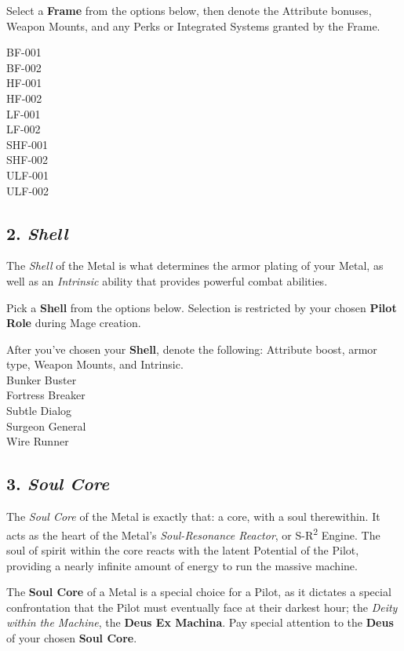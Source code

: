 \documentclass[
]{article}
\begin{document}
Select a \textbf{Frame} from the options below, then denote the
Attribute bonuses, Weapon Mounts, and any Perks or Integrated Systems
granted by the Frame.

{BF-001}\\
{BF-002}\\
{HF-001}\\
{HF-002}\\
{LF-001}\\
{LF-002}\\
{SHF-001}\\
{SHF-002}\\
{ULF-001}\\
{ULF-002}

\hypertarget{shell}{%
\subsection{\texorpdfstring{2. \emph{Shell}}{2. Shell}}\label{shell}}

The \emph{Shell} of the Metal is what determines the armor plating of
your Metal, as well as an \emph{Intrinsic} ability that provides
powerful combat abilities.

Pick a \textbf{Shell} from the options below. Selection is restricted by
your chosen \textbf{Pilot Role} during Mage creation.

After you've chosen your \textbf{Shell}, denote the following: Attribute
boost, armor type, Weapon Mounts, and Intrinsic.\\
{Bunker Buster}\\
{Fortress Breaker}\\
{Subtle Dialog}\\
{Surgeon General}\\
{Wire Runner}

\hypertarget{soul-core}{%
\subsection{\texorpdfstring{3. \emph{Soul
Core}}{3. Soul Core}}\label{soul-core}}

The \emph{Soul Core} of the Metal is exactly that: a core, with a soul
therewithin. It acts as the heart of the Metal's \emph{Soul-Resonance
Reactor}, or S-R\textsuperscript{2} Engine. The soul of spirit within
the core reacts with the latent Potential of the Pilot, providing a
nearly infinite amount of energy to run the massive machine.

The \textbf{Soul Core} of a Metal is a special choice for a Pilot, as it
dictates a special confrontation that the Pilot must eventually face at
their darkest hour; the \emph{Deity within the Machine}, the
\textbf{Deus Ex Machina}. Pay special attention to the \textbf{Deus} of
your chosen \textbf{Soul Core}.
\end{document}
